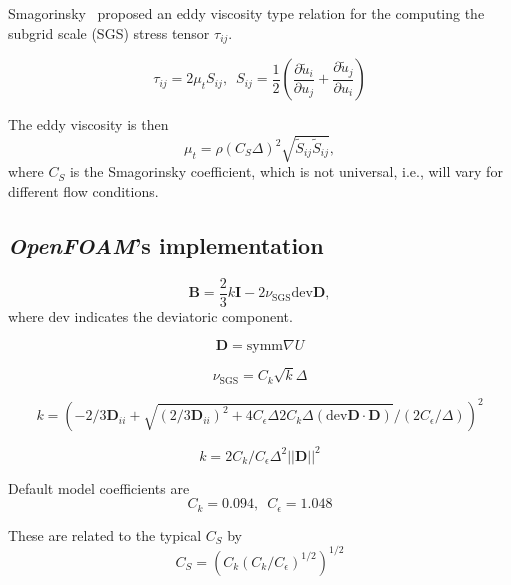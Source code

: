 Smagorinsky~\cite{Smagorinsky1963} proposed an eddy viscosity type relation for
the computing the subgrid scale (SGS) stress tensor $\tau_{ij}$.

\begin{equation}
    \tau_{ij} = 2 \mu_t S_{ij}, \, \, \,
    S_{ij} = \frac{1}{2}
    \left(
    \frac{\partial \tilde{u}_i}{\partial u_j}
    + \frac{\partial \tilde{u}_j}{\partial u_i}
    \right)
\end{equation}

The eddy viscosity is then
\begin{equation}
    \mu_t = \rho (C_S \Delta)^2 \sqrt{\tilde{S}_{ij} \tilde{S}_{ij}},
\end{equation}
where $C_S$ is the Smagorinsky coefficient, which is not universal, i.e., will
vary for different flow conditions.


\subsection{\textit{OpenFOAM}'s implementation}


\begin{equation}
    \mathbf{B} = \frac{2}{3}k \mathbf{I}
    - 2 \nu_{\mathrm{SGS}} \mathrm{dev} \mathbf{D},
\end{equation}
where $\mathrm{dev}$ indicates the deviatoric component.

\begin{equation}
    \mathbf{D} = \mathrm{symm} \nabla U
\end{equation}

\begin{equation}
    \nu_{\mathrm{SGS}} = C_k \sqrt{k} \Delta
\end{equation}

\begin{equation}
    k =
    (
    -2/3 \mathbf{D}_{ii} + \sqrt{(2/3 \mathbf{D}_{ii})^2
    + 4C_\epsilon \Delta 2 C_k \Delta
    (\mathrm{dev} \mathbf{D} \cdot \mathbf{D})}
    / (2 C_\epsilon / \Delta)
    )^2
\end{equation}

\begin{equation}
    k = 2 C_k/C_\epsilon \Delta^2 ||\mathbf{D}||^2
\end{equation}

Default model coefficients are
\begin{equation}
    C_k = 0.094, \, \, \,
    C_\epsilon = 1.048
\end{equation}

These are related to the typical $C_S$ by
\begin{equation}
    C_S =
    \left(
        C_k \left(C_k / C_\epsilon \right)^{1/2}
    \right)^{1/2}
\end{equation}

